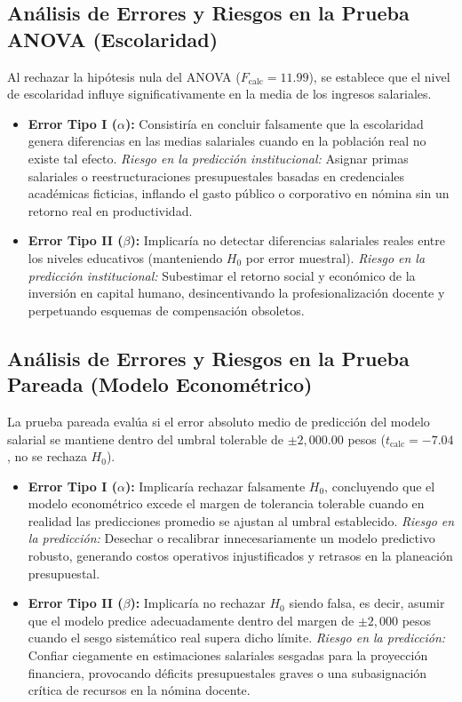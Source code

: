 \documentclass[10pt,twocolumn,a4paper]{article}
\begin{document}
\subsection{Análisis de Errores y Riesgos en la Prueba ANOVA (Escolaridad)}
Al rechazar la hipótesis nula del ANOVA ($F_{\text{calc}} = 11.99$), se establece que el nivel de escolaridad influye significativamente en la media de los ingresos salariales. 
\begin{itemize}
    \item \textbf{Error Tipo I ($\alpha$):} Consistiría en concluir falsamente que la escolaridad genera diferencias en las medias salariales cuando en la población real no existe tal efecto. \textit{Riesgo en la predicción institucional:} Asignar primas salariales o reestructuraciones presupuestales basadas en credenciales académicas ficticias, inflando el gasto público o corporativo en nómina sin un retorno real en productividad.
    \item \textbf{Error Tipo II ($\beta$):} Implicaría no detectar diferencias salariales reales entre los niveles educativos (manteniendo $H_0$ por error muestral). \textit{Riesgo en la predicción institucional:} Subestimar el retorno social y económico de la inversión en capital humano, desincentivando la profesionalización docente y perpetuando esquemas de compensación obsoletos.
\end{itemize}

\subsection{Análisis de Errores y Riesgos en la Prueba Pareada (Modelo Econométrico)}
La prueba pareada evalúa si el error absoluto medio de predicción del modelo salarial se mantiene dentro del umbral tolerable de $\pm 2,000.00$ pesos ($t_{\text{calc}} = -7.04$, no se rechaza $H_0$).
\begin{itemize}
    \item \textbf{Error Tipo I ($\alpha$):} Implicaría rechazar falsamente $H_0$, concluyendo que el modelo econométrico excede el margen de tolerancia tolerable cuando en realidad las predicciones promedio se ajustan al umbral establecido. \textit{Riesgo en la predicción:} Desechar o recalibrar innecesariamente un modelo predictivo robusto, generando costos operativos injustificados y retrasos en la planeación presupuestal.
    \item \textbf{Error Tipo II ($\beta$):} Implicaría no rechazar $H_0$ siendo falsa, es decir, asumir que el modelo predice adecuadamente dentro del margen de $\pm 2,000$ pesos cuando el sesgo sistemático real supera dicho límite. \textit{Riesgo en la predicción:} Confiar ciegamente en estimaciones salariales sesgadas para la proyección financiera, provocando déficits presupuestales graves o una subasignación crítica de recursos en la nómina docente.
\end{itemize}
\end{document}
